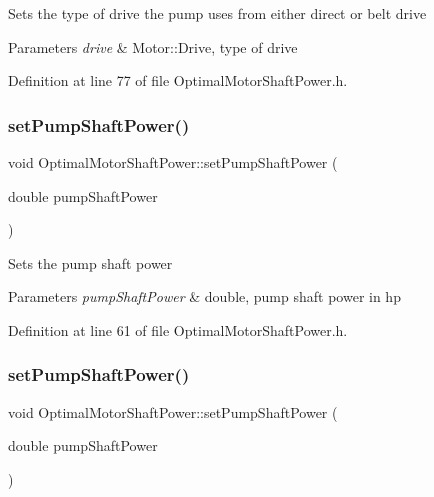 Sets the type of drive the pump uses from either direct or belt drive 
\begin{DoxyParams}{Parameters}
{\em drive} & Motor\+::\+Drive, type of drive \\
\hline
\end{DoxyParams}


Definition at line 77 of file Optimal\+Motor\+Shaft\+Power.\+h.

\mbox{\label{class_optimal_motor_shaft_power_ab2d80927fbaa62705359700b2a8f2f26}} 
\subsubsection{\texorpdfstring{set\+Pump\+Shaft\+Power()}{setPumpShaftPower()}\hspace{0.1cm}{\footnotesize\ttfamily [1/3]}}
{\footnotesize\ttfamily void Optimal\+Motor\+Shaft\+Power\+::set\+Pump\+Shaft\+Power (\begin{DoxyParamCaption}\item[{double}]{pump\+Shaft\+Power }\end{DoxyParamCaption})\hspace{0.3cm}{\ttfamily [inline]}}

Sets the pump shaft power 
\begin{DoxyParams}{Parameters}
{\em pump\+Shaft\+Power} & double, pump shaft power in hp \\
\hline
\end{DoxyParams}


Definition at line 61 of file Optimal\+Motor\+Shaft\+Power.\+h.

\mbox{\label{class_optimal_motor_shaft_power_ab2d80927fbaa62705359700b2a8f2f26}} 
\subsubsection{\texorpdfstring{set\+Pump\+Shaft\+Power()}{setPumpShaftPower()}\hspace{0.1cm}{\footnotesize\ttfamily [2/3]}}
{\footnotesize\ttfamily void Optimal\+Motor\+Shaft\+Power\+::set\+Pump\+Shaft\+Power (\begin{DoxyParamCaption}\item[{double}]{pump\+Shaft\+Power }\end{DoxyParamCaption})\hspace{0.3cm}{\ttfamily [inline]}}

